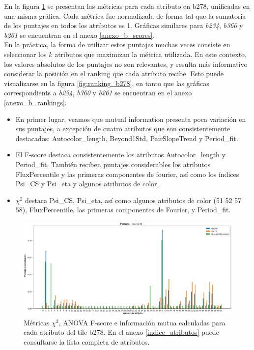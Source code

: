 En la figura \ref{fig:scores_b278} se presentan las métricas para cada atributo en b278, unificadas en una misma gráfica. Cada métrica fue normalizada de forma tal que la sumatoria de los puntajes en todos los atributos es 1. Gráficas similares para \textit{b234}, \textit{b360} y \textit{b261} se encuentran en el anexo \ref{anexo_b_scores}. \\

En la práctica, la forma de utilizar estos puntajes muchas veces consiste en seleccionar los $k$ atributos que maximizan la métrica utilizada. En este contexto, los valores absolutos de los puntajes no son relevantes, y resulta más informativo considerar la posición en el ranking que cada atributo recibe. Esto puede visualizarse en la figura \ref{fig:ranking_b278}, en tanto que las gráficas correspondients a \textit{b234}, \textit{b360} y \textit{b261} se encuentran en el anexo \ref{anexo_b_rankings}. 

\begin{itemize}
\item En primer lugar, veamos que mutual information presenta poca variación en sus puntajes, a excepción de cuatro atributos que son consistentemente destacados: Autocolor\_length, Beyond1Std, PairSlopeTrend y Period\_fit.
\item El F-score destaca consistentemente los atributos Autocolor\_length y Period\_fit. También reciben puntajes considerables los atributos FluxPercentile y las primeras componentes de fourier, así como los índices Psi\_CS y Psi\_eta y algunos atributos de color.
\item $\chi^2$ destaca Psi\_CS, Psi\_eta, así como algunos atributos de color (51 52 57 58), FluxPercentile, las primeras componentes de Fourier, y Period\_fit.
\end{itemize}


\begin{figure}[h!]
\centering
  \includegraphics[width=1\textwidth]{Kap6/test=b278_variable_importance_scores}
\caption{ Métricas $\chi^2$, ANOVA F-score e información mutua calculadas para cada atributo del tile b278. En el anexo \protect\ref{indice_atributos} puede consultarse la lista completa de atributos. }
\label{fig:scores_b278}
\end{figure}

